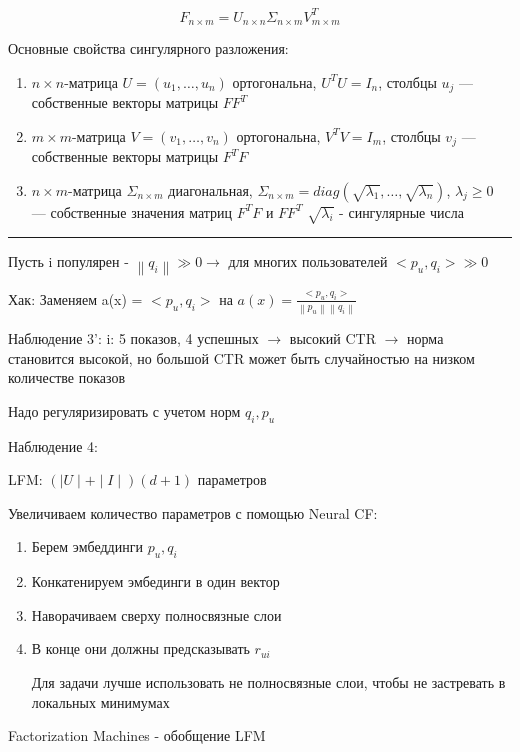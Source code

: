 \documentclass[a4paper, 12pt]{article}
\newcommand\norm[1]{\left\lVert#1\right\rVert}
\begin{document}
\begin{enumerate}
\begin{enumerate}
        \[F_{n \times m} =
        U_{n \times n}
        \Sigma_{n \times m}
        V^T_{m \times m}\]

        Основные свойства сингулярного разложения:

        \begin{enumerate}
            \item $n \times n$-матрица $U=(u_1, \dots, u_n)$ 
            ортогональна, 
            $U^TU=I_n$,
            столбцы $u_j$ — собственные векторы матрицы $FF^T$
            \item $m \times m$-матрица $V=(v_1, \dots, v_n)$ 
            ортогональна, 
            $V^TV=I_m$,
            столбцы $v_j$ — собственные векторы матрицы $F^TF$
            \item $n \times m$-матрица $\Sigma_{n \times m}$
            диагональная, 
            $\Sigma_{n \times m} = diag(\sqrt{\lambda_1}, 
            \dots, \sqrt{\lambda_n})$,
            $\lambda_j \geq 0$ — собственные значения матриц 
            $F^TF$ и $FF^T$
            $\sqrt{\lambda_i}$ - сингулярные числа
        \end{enumerate}

        \rule{\linewidth}{0.5pt}

        Пусть i популярен - $\norm{q_i} \gg 0 \rightarrow$
        для многих пользователей $<p_u, q_i> \gg 0$ 

        Хак: Заменяем a(x) = $<p_u, q_i>$ на
        $a(x) = \frac{<p_u, q_i>}{\norm{p_u}\norm{q_i}}$

        Наблюдение 3':
        i: 5 показов, 4 успешных $\rightarrow$ высокий CTR
        $\rightarrow$ норма становится высокой, но 
        большой CTR может быть случайностью на низком количестве
        показов

        Надо регуляризировать с учетом норм $q_i, p_u$

        Наблюдение 4:

        LFM: $(\mid U \mid + \mid I \mid)(d + 1)$ параметров

        Увеличиваем количество параметров с помощью Neural CF:

        \begin{enumerate}
            \item Берем эмбеддинги $p_u, q_i$
            \item Конкатенируем эмбединги в один вектор
            \item Наворачиваем сверху полносвязные слои
            \item В конце они должны предсказывать $r_{ui}$
            
            Для задачи лучше использовать не полносвязные слои,
            чтобы не застревать в локальных минимумах
        \end{enumerate}

        Factorization Machines - обобщение LFM
    \end{enumerate}
\end{enumerate}
\end{document}
